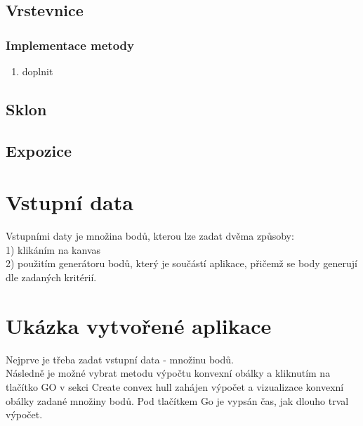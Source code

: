 \documentclass[a4paper, 12pt]{article}
\begin{document}
\clearpage

\subsection{Vrstevnice}

\subsubsection{Implementace metody}
\begin{enumerate}
	\item doplnit
\end{enumerate}

\subsection{Sklon}

\subsection{Expozice}



\section{Vstupní data}

Vstupními daty je množina bodů, kterou lze zadat dvěma způsoby:\\
1) klikáním na kanvas\\
2) použitím generátoru bodů, který je součástí aplikace, přičemž se body generují dle zadaných kritérií.\\


\clearpage
\section{Ukázka vytvořené aplikace}


\clearpage


Nejprve je třeba zadat vstupní data - množinu bodů.\\


Následně je možné vybrat metodu výpočtu konvexní obálky a kliknutím na tlačítko GO v 
sekci Create convex hull zahájen výpočet a vizualizace konvexní obálky zadané množiny bodů.
Pod tlačítkem Go je vypsán čas, jak dlouho trval výpočet.\\
\end{document}
